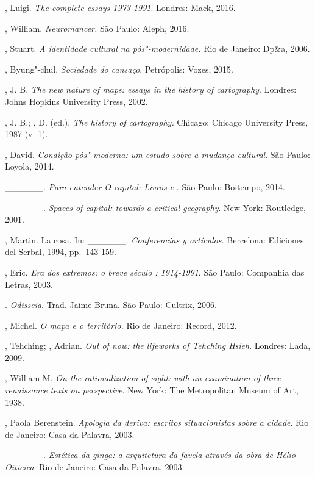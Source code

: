 \begin{Parskip}
, Luigi. \emph{The complete essays 1973-1991}. Londres: Mack,
2016.

, William. \emph{Neuromancer.} São Paulo: Aleph, 2016.

, Stuart. \emph{A identidade cultural na pós"-modernidade.} Rio de
Janeiro: Dp\&a, 2006.

, Byung"-chul. \emph{Sociedade do cansaço}. Petrópolis: Vozes, 2015.

, J. B. \emph{The new nature of maps: essays in the history of
cartography}. Londres: Johns Hopkins University Press, 2002.

, J. B.; , D. (ed.). \emph{The history of cartography.}
Chicago: Chicago University Press, 1987 (v. 1).

, David. \emph{Condição pós"-moderna: um estudo sobre a mudança
cultural}. São Paulo: Loyola, 2014.

\_\_\_\_\_\_. \emph{Para entender \emph{O capital}: Livros  e
}. São Paulo: Boitempo, 2014.

\_\_\_\_\_\_. \emph{Spaces of capital: towards a critical
geography}. New York: Routledge, 2001.

, Martin. La cosa. In: \_\_\_\_\_\_. \emph{Conferencias y
artículos.} Bercelona: Ediciones del Serbal, 1994, pp.~143-159.

, Eric. \emph{Era dos extremos: o breve século : 1914-1991}.
São Paulo: Companhia das Letras, 2003.

. \emph{Odisseia}. Trad. Jaime Bruna. São Paulo: Cultrix, 2006.

, Michel. \emph{O mapa e o território.} Rio de Janeiro:
Record, 2012.

, Tehching; , Adrian. \emph{Out of now: the lifeworks
of Tehching Hsieh}. Londres: Lada, 2009.

, William M. \emph{On the rationalization of sight: with an
examination of three renaissance texts on perspective}. New York: The
Metropolitan Museum of Art, 1938.

, Paola Berenstein. \emph{Apologia da deriva: escritos
situacionistas sobre a cidade}. Rio de Janeiro: Casa da Palavra, 2003.

\_\_\_\_\_\_. \emph{Estética da ginga: a arquitetura da favela
através da obra de Hélio Oiticica}. Rio de Janeiro: Casa da Palavra,
2003.


\end{Parskip}
